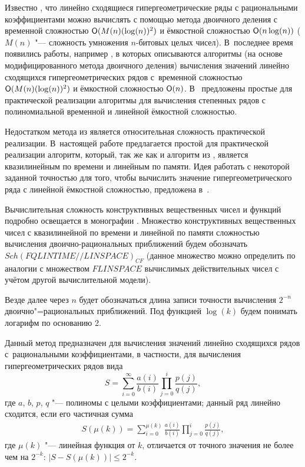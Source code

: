 Известно \cite{yakhontov:bib:Haible}, что линейно сходящиеся
гипергеометрические ряды с рациональными коэффициентами можно
вычислять с помощью метода двоичного деления с временной сложностью
${\sf O}(M(n)(\log(n))^2)$ и ёмкостной сложностью ${\sf O}(n\log(n))$ ($M(n)$
"--- сложность умножения $n$-битовых целых чисел).
В~последнее время появились работы, например \cite{yakhontov:bib:Cheng},
в которых описываются алгоритмы (на основе модифицированного метода
двоичного деления) вычисления значений линейно сходящихся
гипергеометрических рядов с~временной сложностью
${\sf O}(M(n)(\log(n))^2)$ и ёмкостной сложностью ${\sf O}(n)$.
В~\cite{yakhontov:bib:Yakhontov} предложены простые для 
практической реализации алгоритмы для вычисления степенных рядов
с полиномиальной временной и линейной ёмкостной сложностью.

Недостатком метода из \cite{yakhontov:bib:Cheng} является
относительная сложность практической реализации. В~настоящей
работе предлагается простой для практической реализации алгоритм,
который, так же как и алгоритм из \cite{yakhontov:bib:Cheng},
является квазилинейным по времени и линейным по памяти.
Идея работать с некоторой заданной точностью для того, чтобы
вычислить значение гипергеометрического ряда с линейной
ёмкостной сложностью, предложена в~\cite{yakhontov:bib:numbers}.

Вычислительная сложность конструктивных вещественных чисел и функций
подробно освещается в монографии \cite{yakhontov:bib:Ko}. Множество
конструктивных вещественных чисел с квазилинейной по времени и линейной
по памяти сложностью вычисления двоично-рациональных приближений будем
обозначать $Sch(FQLINTIME//LINSPACE)_{CF}$ (данное множество можно определить
по аналогии с множеством $FLINSPACE$ вычислимых действительных чисел
\cite{yakhontov:bib:Yakhontov} с учётом другой вычислительной модели).

Везде далее через $n$ будет обозначаться длина записи точности вычисления
$2^{-n}$ двоично"=рациональных приближений. Под функцией $\log(k)$ будем
понимать логарифм по основанию 2.


\smallskip

Данный метод предназначен для вычисления значений линейно сходящихся
рядов с~рациональными коэффициентами, в частности, для вычисления
гипергеометрических рядов вида
\begin{equation}
S=\sum_{i=0}^{\infty}{\frac{a(i)}{b(i)}
\prod_{j=0}^{i}{\frac{p(j)}{q(j)}}},
\label{eq:yah:SeriesDef}
\end{equation}
где $a$, $b$, $p$, $q$ "--- полиномы с целыми коэффициентами;
данный ряд линейно сходится, если его частичная сумма
\begin{align}
S(\mu(k))=\sum_{i=0}^{\mu(k)}{\frac{a(i)}{b(i)}
\prod_{j=0}^{i}{\frac{p(j)}{q(j)}}},
\label{eq:yah:SeriesPartialSum}
\end{align}
где $\mu(k)$ "--- линейная функция от $k$, отличается от точного значения не более чем на $2^{-k}$: $|S-S(\mu(k))|\le 2^{-k}$.

